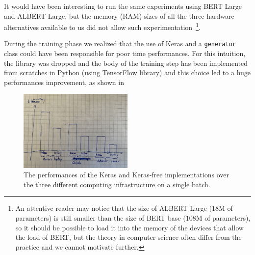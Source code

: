 \documentclass[10pt,hidelinks]{article}
\begin{document}
It would have been interesting to run the same experiments using BERT Large and ALBERT Large, but the memory (RAM) sizes of all the three hardware alternatives available to us did not allow such experimentation~\footnote{An attentive reader may notice that the size of ALBERT Large ($18$M of parameters) is still smaller than the size of BERT base ($108$M of parameters), so it should be possible to load it into the memory of the devices that allow the load of BERT, but the theory in computer science often differ from the practice and we cannot motivate further.}.


During the training phase we realized that the use of Keras and a \texttt{generator} class  could have been responsible for poor time performances.
For this intuition, the library was dropped and the body of the training step has been implemented from scratches in Python (using TensorFlow library) and this choice led to a huge performances improvement, as shown in 


\begin{figure}[ht!]
	\centering
	\includegraphics[width=0.5\textwidth]{pics/performances.JPG}
	\caption{The performances of the Keras and Keras-free implementations over the three different computing infrastructure on a single batch.}\label{fig:performances}
\end{figure}


\end{document}
